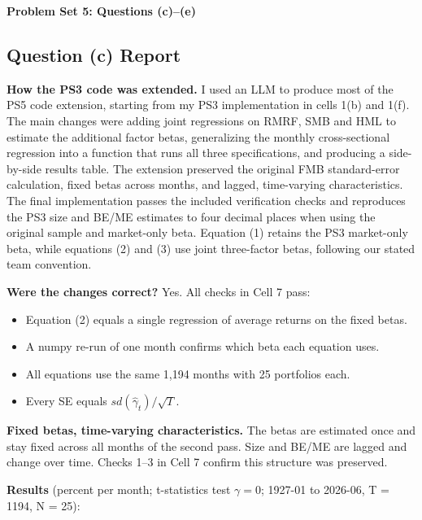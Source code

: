 \documentclass[11pt,letterpaper]{article}
\begin{document}
\begin{center}
{\Large\bfseries Problem Set 5: Questions (c)--(e)}
\end{center}

\hypertarget{question-c-report}{%
\subsection{Question (c) Report}\label{question-c-report}}

\textbf{How the PS3 code was extended.} I used an LLM to produce most of the PS5 code extension, starting from my PS3 implementation in cells 1(b) and 1(f). The main changes were adding joint regressions on RMRF, SMB and HML to estimate the additional factor betas, generalizing the monthly cross-sectional regression into a function that runs all three specifications, and producing a side-by-side results table. The extension preserved the original FMB standard-error calculation, fixed betas across months, and lagged, time-varying characteristics. The final implementation passes the included verification checks and reproduces the PS3 size and BE/ME estimates to four decimal places when using the original sample and market-only beta. Equation (1) retains the PS3 market-only beta, while equations (2) and (3) use joint three-factor betas, following our stated team convention.

\textbf{Were the changes correct?} Yes. All checks in Cell 7 pass:

\begin{itemize}
\item
  Equation (2) equals a single regression of average returns on the fixed betas.
\item
  A numpy re-run of one month confirms which beta each equation uses.
\item
  All equations use the same 1,194 months with 25 portfolios each.
\item
  Every SE equals \(sd(\hat\gamma_t)/\sqrt{T}\).
\end{itemize}

\textbf{Fixed betas, time-varying characteristics.} The betas are estimated once and stay fixed across all months of the second pass. Size and BE/ME are lagged and change over time. Checks 1--3 in Cell 7 confirm this structure was preserved.

\textbf{Results} (percent per month; t-statistics test \(\gamma = 0\); 1927-01 to 2026-06, T = 1194, N = 25):
\end{document}
